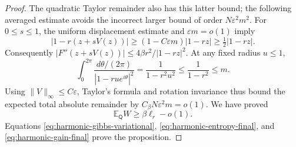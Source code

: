 \documentclass[11pt,a4paper]{article}
\numberwithin{equation}{section}
\theoremstyle{definition}
\theoremstyle{remark}
\begin{document}
\begin{proof}
The quadratic Taylor remainder also has this latter bound; the following
averaged estimate avoids the incorrect larger bound of order
$N\varepsilon^2m^2$. For $0\leq s\leq1$, the uniform displacement
estimate and $\varepsilon m=o(1)$ imply
\[
 |1-r(z+sV(z))|\geq(1-C\varepsilon m)|1-rz|
                          \geq\tfrac12|1-rz|.
\]
Consequently
$|F''(z+sV(z))|\leq4\beta r^2/|1-rz|^2$.
At any fixed radius $u\leq1$,
\[
 \int_0^{2\pi}\frac{d\theta/(2\pi)}{|1-ru e^{i\theta}|^2}
 =\frac1{1-r^2u^2}\leq\frac1{1-r^2}\leq m.
\]
Using $\|V\|_\infty\leq C\varepsilon$, Taylor's formula and rotation
invariance thus bound the expected total absolute remainder by
$C_\beta N\varepsilon^2m=o(1)$. We have proved
\begin{equation}
 \mathbb E_{\mathsf Q}W\geq\beta\ell_r-o(1).
 \label{eq:harmonic-gain-final}
\end{equation}
Equations \eqref{eq:harmonic-gibbs-variational},
\eqref{eq:harmonic-entropy-final}, and
\eqref{eq:harmonic-gain-final} prove the proposition.
\end{proof}
\end{document}
